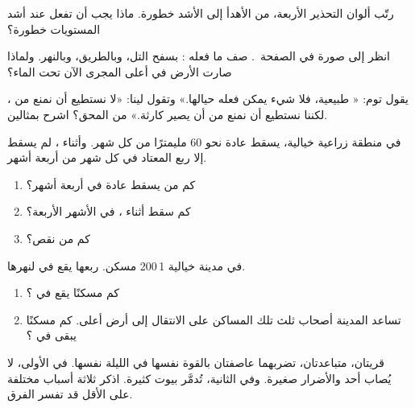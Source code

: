 \begin{exercise}[$\star$]\label{exo:g5:natural-hazards:6}
رتّب ألوان التحذير الأربعة، من الأهدأ إلى الأشد
خطورة. ماذا يجب أن تفعل عند أشد المستويات خطورة؟
\end{exercise}

\begin{exercise}[$\star\star$]\label{exo:g5:natural-hazards:7}
انظر إلى صورة  في
الصفحة~\pageref{fig:g5:natural-hazards:landslide}. صف ما فعله
 : بسفح التل، وبالطريق، وبالنهر.
ولماذا صارت الأرض في أعلى المجرى الآن تحت الماء؟
\end{exercise}

\begin{exercise}[$\star\star$]\label{exo:g5:natural-hazards:8}
يقول توم: « طبيعية، فلا شيء يمكن فعله حيالها.» وتقول
لينا: «لا نستطيع أن نمنع  من ، لكننا نستطيع أن نمنع  من
أن يصير كارثة.» من المحق؟ اشرح بمثالين.
\end{exercise}

\begin{exercise}[$\star\star$]\label{exo:g5:natural-hazards:9}
في منطقة زراعية خيالية، يسقط عادة نحو 60 مليمترًا من 
كل شهر. وأثناء ، لم يسقط إلا ربع  المعتاد في كل شهر
من أربعة أشهر.
\begin{enumerate}
  \item[(أ)] كم من  يسقط عادة في أربعة أشهر؟
  \item[(ب)] كم سقط أثناء ، في الأشهر الأربعة؟
  \item[(ج)] كم من  نقص؟
\end{enumerate}
\end{exercise}

\begin{exercise}[$\star\star$]\label{exo:g5:natural-hazards:10}
في مدينة خيالية 1\,200 مسكن. ربعها يقع في
 لنهرها.
\begin{enumerate}
  \item[(أ)] كم مسكنًا يقع في ؟
  \item[(ب)] تساعد المدينة أصحاب ثلث تلك المساكن على الانتقال إلى
        أرض أعلى. كم مسكنًا يبقى في ؟
\end{enumerate}
\end{exercise}

\begin{exercise}[$\star\star\star$]\label{exo:g5:natural-hazards:11}
قريتان، متباعدتان، تضربهما عاصفتان بالقوة نفسها في الليلة
نفسها. في الأولى، لا يُصاب أحد والأضرار صغيرة. وفي الثانية،
تُدمَّر بيوت كثيرة. اذكر ثلاثة أسباب مختلفة على الأقل قد
تفسر الفرق.
\end{exercise}
